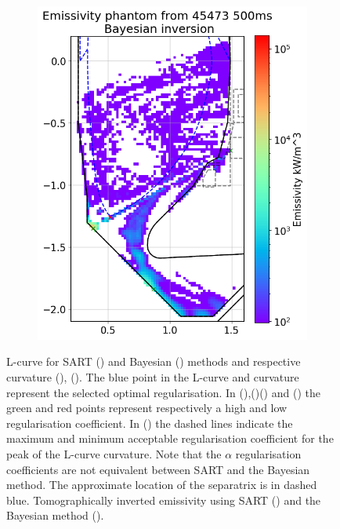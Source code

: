 \begin{figure}
\begin{subfigure}{0.45\linewidth}
         \caption{}
         \label{fig:SOLPS_phantom2e}
     \end{subfigure}
     \hfill
     \begin{subfigure}{0.45\linewidth}
         \centering
         \includegraphics[trim={0 0 0 45},clip,width=\textwidth]{Chapters/chapter2/figs/inversion_comparison_emissivity_SOLPS_pantom_test-Bayes.png}
         \caption{}
         \label{fig:SOLPS_phantom2f}
     \end{subfigure}
     \caption{L-curve for SART () and Bayesian () methods and respective curvature (), (). The blue point in the L-curve and curvature represent the selected optimal regularisation. In (),()() and () the green and red points represent respectively a high and low regularisation coefficient. In () the dashed lines indicate the maximum and minimum acceptable regularisation coefficient for the peak of the L-curve curvature. Note that the $\alpha$ regularisation coefficients are not equivalent between SART and the Bayesian method. The approximate location of the separatrix is in dashed blue. Tomographically inverted emissivity using SART () and the Bayesian method ().}
    \label{fig:SOLPS_phantom2}
\end{figure}

